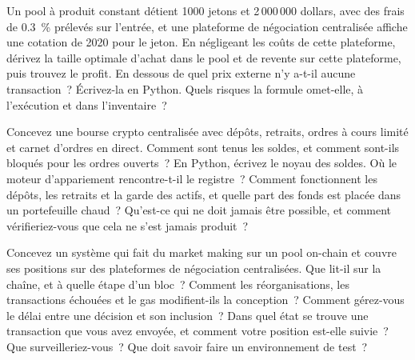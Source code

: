 \begin{question}\label{iq:iv3:smart-contracts-and-crypto-engineering:28}
Un pool à produit constant détient 1000 jetons et 2\,000\,000 dollars, avec des frais de 0.3~\% prélevés sur l'entrée, et une plateforme de négociation centralisée affiche une cotation de 2020 pour le jeton. En négligeant les coûts de cette plateforme, dérivez la taille optimale d'achat dans le pool et de revente sur cette plateforme, puis trouvez le profit. En dessous de quel prix externe n'y a-t-il aucune transaction~? Écrivez-la en Python. Quels risques la formule omet-elle, à l'exécution et dans l'inventaire~?
\end{question}

\begin{question}\label{iq:iv3:smart-contracts-and-crypto-engineering:29}
Concevez une bourse crypto centralisée avec dépôts, retraits, ordres à cours limité et carnet d'ordres en direct. Comment sont tenus les soldes, et comment sont-ils bloqués pour les ordres ouverts~? En Python, écrivez le noyau des soldes. Où le moteur d'appariement rencontre-t-il le registre~? Comment fonctionnent les dépôts, les retraits et la garde des actifs, et quelle part des fonds est placée dans un portefeuille chaud~? Qu'est-ce qui ne doit jamais être possible, et comment vérifieriez-vous que cela ne s'est jamais produit~?
\end{question}

\begin{question}\label{iq:iv3:smart-contracts-and-crypto-engineering:30}
Concevez un système qui fait du market making sur un pool on-chain et couvre ses positions sur des plateformes de négociation centralisées. Que lit-il sur la chaîne, et à quelle étape d'un bloc~? Comment les réorganisations, les transactions échouées et le gas modifient-ils la conception~? Comment gérez-vous le délai entre une décision et son inclusion~? Dans quel état se trouve une transaction que vous avez envoyée, et comment votre position est-elle suivie~? Que surveilleriez-vous~? Que doit savoir faire un environnement de test~?
\end{question}

